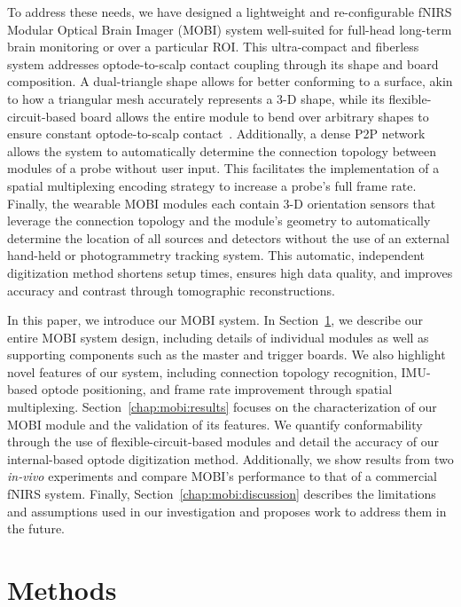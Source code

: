 To address these needs, we have designed a lightweight and re-configurable \ac{fNIRS} Modular Optical Brain Imager (\ac{MOBI}) system well-suited for full-head long-term brain monitoring or over a particular \ac{ROI}. This ultra-compact and fiberless system addresses optode-to-scalp contact coupling through its shape and board composition. A dual-triangle shape allows for better conforming to a surface, akin to how a triangular mesh accurately represents a 3-D shape, while its flexible-circuit-based board allows the entire module to bend over arbitrary shapes to ensure constant optode-to-scalp contact~\cite{Bartkowski2019, Muehlemann2008}. Additionally, a dense \ac{P2P} network allows the system to automatically determine the connection topology between modules of a probe without user input. This facilitates the implementation of a spatial multiplexing encoding strategy to increase a probe's full frame rate. Finally, the wearable \ac{MOBI} modules each contain 3-D orientation sensors that leverage the connection topology and the module's geometry to automatically determine the location of all sources and detectors without the use of an external hand-held or photogrammetry tracking system. This automatic, independent digitization method shortens setup times, ensures high data quality, and improves accuracy and contrast through tomographic reconstructions.

In this paper, we introduce our \ac{MOBI} system. In Section~\ref{chap:mobi:methods}, we describe our entire \ac{MOBI} system design, including details of individual modules as well as supporting components such as the master and trigger boards. We also highlight novel features of our system, including connection topology recognition, \ac{IMU}-based optode positioning, and frame rate improvement through spatial multiplexing. Section~\ref{chap:mobi:results} focuses on the characterization of our \ac{MOBI} module and the validation of its features. We quantify conformability through the use of flexible-circuit-based modules and detail the accuracy of our internal-based optode digitization method. Additionally, we show results from two \emph{in-vivo} experiments and compare \ac{MOBI}'s performance to that of a commercial \ac{fNIRS} system. Finally, Section~\ref{chap:mobi:discussion} describes the limitations and assumptions used in our investigation and proposes work to address them in the future.  




\section{Methods}
\label{chap:mobi:methods}

